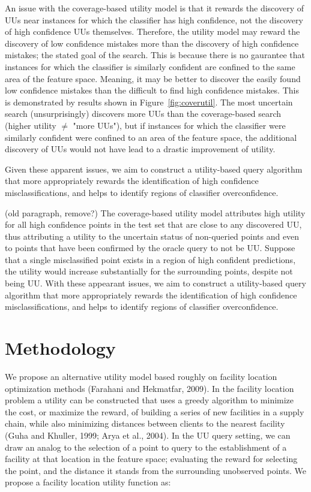\documentclass[letterpaper]{article} %
\newcommand{\km}[1]{{\color{red} #1}} %
\begin{document}
An issue with the coverage-based utility model is that it rewards the discovery of UUs near instances for which the classifier has high confidence, not the discovery of high confidence UUs themselves.  Therefore, the utility model may reward the discovery of low confidence mistakes more than the discovery of high confidence mistakes; the stated goal of the search. This is because there is no gaurantee that instances for which the classifier is similarly confident are confined to the same area of the feature space.  Meaning, it may be better to discover the easily found low confidence mistakes than the difficult to find high confidence mistakes. This is demonstrated by results shown in Figure~\ref{fig:coverutil}. The most uncertain search (unsurprisingly) discovers more UUs than the coverage-based search \km{(higher utility $\ne$ "more UUs")}, but if instances for which the classifier were similarly confident were confined to an area of the feature space, the additional discovery of UUs would not have lead to a drastic improvement of utility.

Given these apparent issues, we aim to construct a utility-based query algorithm that more appropriately rewards the identification of high confidence misclassifications, and helps to identify regions of classifier overconfidence.

\km{(old paragraph, remove?)} The coverage-based utility model attributes high utility for all high confidence points in the test set that are close to any discovered UU, thus attributing a utility to the uncertain status of non-queried points and even to points that have been confirmed by the oracle query to not be UU. Suppose that a single misclassified point exists in a region of high confident predictions, the utility would increase substantially for the surrounding points, despite not being UU. With these appearant issues, we aim to construct a utility-based query algorithm that more appropriately rewards the identification of high confidence misclassifications, and helps to identify regions of classifier overconfidence. 

\section{Methodology}

We propose an alternative utility model based roughly on facility location optimization methods  \km{(Farahani and Hekmatfar, 2009)}. In the facility location problem a utility can be constructed that uses a greedy algorithm to minimize the cost, or maximize the reward, of building a series of new facilities in a supply chain, while also minimizing distances between clients to the nearest facility  \km{(Guha and Khuller, 1999; Arya et al., 2004)}. In the UU query setting, we can draw an analog to the selection of a point to query to the establishment of a facility at that location in the feature space; evaluating the reward for selecting the point, and the distance it stands from the surrounding unobserved points. We propose a facility location utility function as: 
\end{document}
